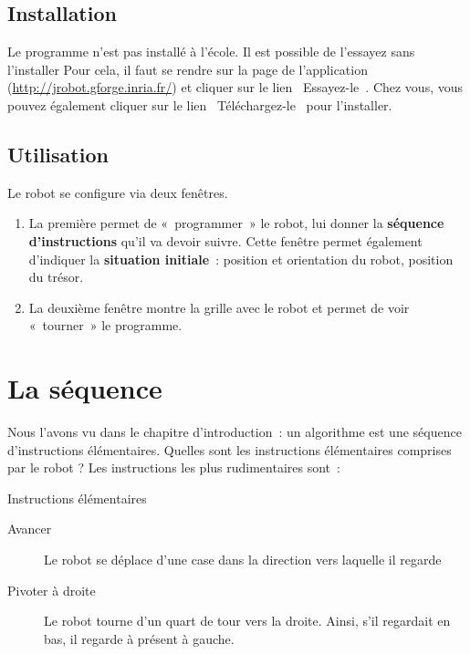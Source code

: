 	\subsection{Installation}

		Le programme n'est pas installé à l'école.
		Il est possible de l'essayez sans l'installer
		Pour cela, il faut se rendre sur la page de l'application
		(\url{http://jrobot.gforge.inria.fr/}) et cliquer sur le lien
		\og~Essayez-le~\fg.
		Chez vous, vous pouvez également cliquer sur le lien 
		\og~Téléchargez-le~\fg{} pour l'installer.
		
	\subsection{Utilisation}

		Le robot se configure via deux fenêtres.

		\begin{enumerate}
		\item 
			La première permet de «~programmer~» le robot, 
			lui donner la \textbf{séquence d'instructions}
			qu'il va devoir suivre. 
			Cette fenêtre permet également
			d'indiquer la \textbf{situation initiale}~: 
			position et orientation du robot, position du trésor.
			
		\item 
			La deuxième fenêtre montre la grille avec le robot 
			et permet de voir «~tourner~» le programme.  
		\end{enumerate}

\section{La séquence}

	Nous l'avons vu dans le chapitre
	d'introduction~: un algorithme est une séquence
	d'instructions élémentaires. Quelles sont les
	instructions élémentaires comprises par le robot ? Les instructions les
	plus rudimentaires sont~:
	
	\begin{Emphase}[definition]{Instructions élémentaires}
		\remonter
		\begin{description}
		\item[Avancer]
			Le robot se déplace d'une case dans la direction vers laquelle il regarde
		\item[Pivoter à droite]
			Le robot tourne d'un quart de tour vers la droite.
			Ainsi, s'il regardait en bas, il regarde à présent à gauche.
		\end{description}
	\end{Emphase}
		
